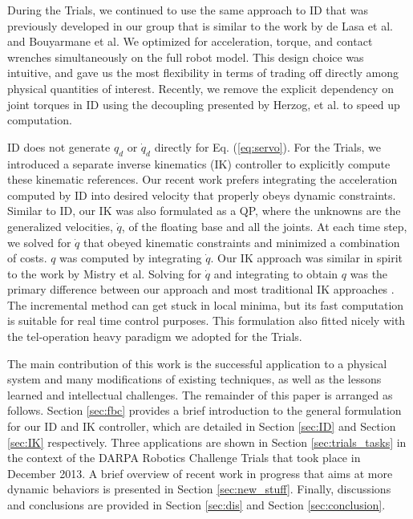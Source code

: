 \documentclass{ws-ijhr}
\newcommand{\eref}[1] {Eq. (\ref{#1})}
\newcommand{\sref}[1] {Section \ref{#1}}
\begin{document}
During the Trials, we continued to use the same approach to ID that was 
previously developed in our group \cite{stephens_thesis,whitman_thesis,sfeng_online} 
that is similar to the work by de Lasa et al. \cite{deLasa_hir} and 
Bouyarmane et al. \cite{bouyarmane_vrc} 
We optimized for acceleration, torque, and contact wrenches simultaneously 
on the full robot model. This design choice was intuitive, and gave us the
most flexibility in terms of trading off directly among physical quantities
of interest. Recently, we remove the explicit dependency on joint torques in
ID using the decoupling presented by Herzog, et al. \cite{alex_hir} to speed
up computation.

ID does not generate $q_d$ or $\dot{q}_d$ directly for \eref{eq:servo}.
For the Trials, we introduced a separate inverse kinematics (IK) controller to
explicitly compute these kinematic references. 
Our recent work prefers integrating the acceleration computed by ID into 
desired velocity that properly obeys dynamic constraints.  
Similar to ID, our IK was also formulated as a QP, where the unknowns are the 
generalized velocities, $\dot{q}$, of the floating base and all the joints. 
At each time step, we solved for $\dot{q}$ that obeyed kinematic constraints 
and minimized a combination of costs. $q$ was computed by integrating $\dot{q}$. 
Our IK approach was similar in spirit to the work by Mistry et al.\cite{mistry_ik} 
Solving for $\dot{q}$ and integrating to obtain $q$ was the primary difference
between our approach and most traditional IK approaches \cite{kajita03,asimo}. 
The incremental method can get stuck in local minima, but its fast computation
is suitable for real time control purposes. 
This formulation also fitted nicely with the tel-operation heavy paradigm we 
adopted for the Trials. 

The main contribution of this work is the successful application to a physical 
system and many modifications of existing techniques, as well as 
the lessons learned and intellectual challenges. 
The remainder of this paper is arranged as follows. 
\sref{sec:fbc} provides a brief introduction to the general formulation for 
our ID and IK controller, which are detailed in \sref{sec:ID} and \sref{sec:IK}
respectively.
Three applications are shown in \sref{sec:trials_tasks} 
in the context of the DARPA Robotics Challenge Trials that took place in 
December 2013. 
A brief overview of recent work in progress that aims at more dynamic behaviors
is presented in \sref{sec:new_stuff}.
Finally, discussions and conclusions are provided 
in \sref{sec:dis} and \sref{sec:conclusion}.
\end{document}
